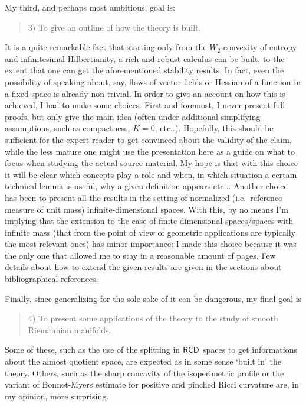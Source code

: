 \documentclass[11pt]{article}
\numberwithin{equation}{section}
\newcommand{\RCD}{{\sf RCD}}
\begin{document}
My third, and perhaps most ambitious, goal is:
\begin{quote}
3) To give an outline of how the theory is built.
\end{quote}
It is a quite remarkable fact that starting only from the $W_2$-convexity of entropy and infinitesimal Hilbertianity, a rich and robust calculus can be built, to the extent that one can get the aforementioned stability results. In fact, even the possibility of speaking about, say, flows of vector fields or Hessian of a function in a fixed space is already non trivial. In order to give an account on how this is achieved, I had to make some  choices. First and foremost, I never present full proofs, but only give the main idea (often under additional simplifying assumptions, such as compactness, $K=0$, etc..). Hopefully, this should be sufficient for the expert reader to get convinced about the validity of the claim, while the less mature one might use the presentation here as a guide on what to focus when studying the actual source material. My hope is that with this choice it will be clear which concepts play a role and when, in which situation a certain technical lemma is useful, why a given definition appears etc... Another choice has been to present all the results in the setting of normalized (i.e.\ reference measure of unit mass) infinite-dimensional spaces. With this, by no means I'm implying that the extension to the case of finite dimensional spaces/spaces with infinite mass (that from the point of view of geometric applications are typically the most relevant ones) has minor importance: I made this choice because it was the only one that allowed me to stay in a reasonable amount of pages. Few details about how to extend the given results are given in the sections about bibliographical references.

Finally, since generalizing for the sole sake of it can be dangerous, my final goal is 
\begin{quote}
4) To present some applications of the theory to the study of smooth Riemannian manifolds.
\end{quote}
Some of these, such as the use of the splitting in $\RCD$ spaces to get informations about the almost quotient space, are expected  as in some sense `built in' the theory. Others, such as the sharp concavity  of the isoperimetric profile  or the variant of Bonnet-Myers estimate for positive and pinched Ricci curvature are, in my opinion, more surprising.

\medskip
\end{document}
